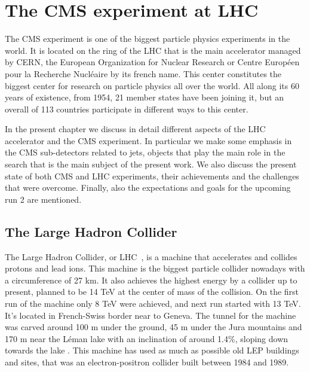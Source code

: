 \chapter[The CMS experiment at LHC]{The CMS experiment at LHC}

The CMS experiment is one of the biggest particle physics experiments in the world. It is located on the ring of the LHC that is the main accelerator managed by CERN, the European Organization for Nuclear Research or Centre Europ\'{e}en pour la Recherche Nucl\'{e}aire by its french name. This center constitutes the biggest center for research on particle physics all over the world. All along its 60 years of existence, from 1954, 21 member states have been joining it, but an overall of 113 countries participate in different ways to this center. 

In the present chapter we discuss in detail different aspects of the LHC accelerator and the CMS experiment. In particular we make some emphasis in the CMS sub-detectors related to jets, objects that play the main role in the search that is the main subject of the present work. We also discuss the present state of both CMS and LHC experiments, their achievements and the challenges that were overcome. Finally, also the expectations and goals for the upcoming run 2 are mentioned.  

\section{The Large Hadron Collider}
\label{sec:LHC}

The Large Hadron Collider, or LHC~\cite{Bruning:782076}, is a machine that accelerates and collides protons and lead ions. This machine is the biggest particle collider nowadays with a circumference of 27 km. It also achieves the highest energy by a collider up to present, planned to be 14 TeV at the center of mass of the collision. On the first run of the machine only 8 TeV were achieved, and next run started with 13 TeV. It's located in French-Swiss border near to Geneva. The tunnel for the machine was carved around 100 m under the ground, 45 m under the Jura mountains and 170 m near the L\'{e}man lake with an inclination of around 1.4\%, sloping down towards the lake . This machine has used as much as possible old LEP buildings and sites, that was an electron-positron collider built between 1984 and 1989. 


